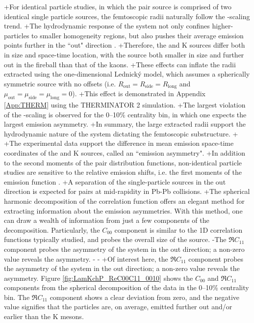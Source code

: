 +For identical particle studies, in which the pair source is comprised of two identical single particle sources, the femtoscopic radii naturally follow the \mt-scaling trend.
+The hydrodynamic response of the system not only confines higher-\mt particles to smaller homogeneity regions, but also pushes their average emission points further in the ``out" direction \cite{Retiere:2003kf}.
+Therefore, the \Lam and K sources differ both in size and space-time location, with the \Lam source both smaller in size and further out in the fireball than that of the kaons.
+These effects can inflate the radii extracted using the one-dimensional Lednick\'y model, which assumes a spherically symmetric source with no offsets (i.e. $R_{\mathrm{out}} = R_{\mathrm{side}} = R_{\mathrm{long}}$ and $\mu_{\mathrm{out}} = \mu_{\mathrm{side}} = \mu_{\mathrm{long}} = 0$).
+This effect is demonstrated in Appendix \ref{App:THERM} using the THERMINATOR 2 simulation.
+The largest violation of the \mt-scaling is observed for the 0--10\% centrality bin, in which one expects the largest emission asymmetry.
+In summary, the large extracted \LamK radii support the hydrodynamic nature of the system dictating the femtoscopic substructure.
+
+The experimental data support the difference in mean emission space-time coordinates of the \Lam and K sources, called an ``emission asymmetry".
+In addition to the second moments of the pair distribution functions, non-identical particle studies are sensitive to the relative emission shifts, i.e. the first moments of the emission function \cite{Kisiel:2009eh}.
+A separation of the single-particle sources in the out direction is expected for \LamK pairs at mid-rapidity in Pb-Pb collisions.
+The spherical harmonic decomposition of the correlation function offers an elegant method for extracting information about the emission asymmetries.
 With this method, one can draw a wealth of information from just a few components of the decomposition.
 Particularly, the $C_{00}$ component is similar to the 1D correlation functions typically studied, and probes the overall size of the source.
-The $\Re C_{11}$ component probes the asymmetry of the system in the out direction; a non-zero value reveals the asymmetry. 
-
-
+Of interest here, the $\Re C_{11}$ component probes the asymmetry of the system in the out direction; a non-zero value reveals the asymmetry. 
 Figure \ref{fig:LamKchP_ReC00C11_0010} shows the $C_{00}$ and $\Re C_{11}$ components from the spherical decomposition of the \LamKchP data in the 0--10\% centrality bin.
 The $\Re C_{11}$ component shows a clear deviation from zero, and the negative value signifies that the \Lam particles are, on average, emitted further out and/or earlier than the K mesons.
